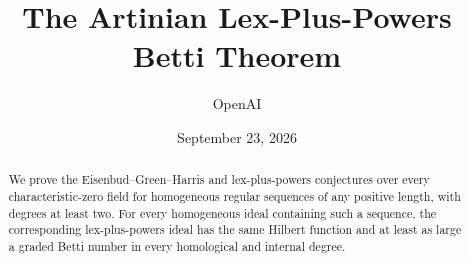 \documentclass[11pt]{article}
\title{The Artinian Lex-Plus-Powers Betti Theorem}
\author{OpenAI}
\date{September 23, 2026}
\theoremstyle{definition}
\theoremstyle{remark}
\numberwithin{equation}{section}
\begin{document}
\maketitle
\begin{abstract}
We prove the Eisenbud--Green--Harris and lex-plus-powers conjectures over every
characteristic-zero field for homogeneous regular sequences of any positive
length, with degrees at least two. For every homogeneous ideal containing such
a sequence, the corresponding lex-plus-powers ideal has the same Hilbert
function and at least as large a graded Betti number in every homological and
internal degree.
\end{abstract}
\tableofcontents










\end{document}
